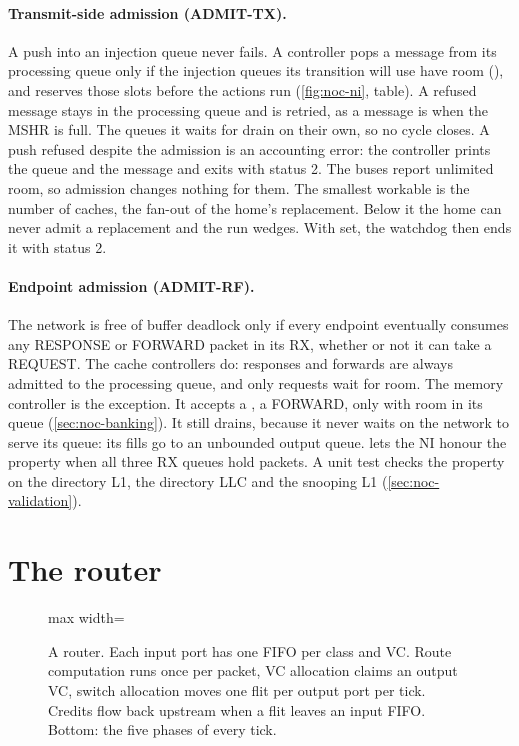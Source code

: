 \paragraph{Transmit-side admission (ADMIT-TX).} A push into an injection queue never fails. A
controller pops a message from its processing queue only if the injection queues its transition
will use have room (), and reserves those slots before the actions run
(\cref{fig:noc-ni}, table). A refused message stays in the processing queue and is retried, as a
message is when the MSHR is full. The queues it waits for drain on their own, so no cycle closes.
A push refused despite the admission is an accounting error: the controller prints the queue and
the message and exits with status 2. The buses report unlimited room, so admission changes nothing
for them. The smallest workable  is the number of caches, the fan-out of
the home's replacement. Below it the home can never admit a replacement and the run wedges. With
 set, the watchdog then ends it with status 2.

\paragraph{Endpoint admission (ADMIT-RF).} The network is free of buffer deadlock only if every
endpoint eventually consumes any RESPONSE or FORWARD packet in its RX, whether or not it can take
a REQUEST. The cache controllers do: responses and forwards are always admitted to the processing
queue, and only requests wait for room. The memory controller  is the
exception. It accepts a , a FORWARD, only with room in its queue
(\cref{sec:noc-banking}). It still drains, because it never waits on the network to serve its
queue: its fills go to an unbounded output queue.
 lets the NI honour the property when all three RX queues hold packets. A unit test checks the property on the directory L1, the
directory LLC and the snooping L1 (\cref{sec:noc-validation}).

\section{The router}\label{sec:noc-router}

\begin{figure}[htbp]\centering
\begin{adjustbox}{max width=\textwidth}\end{adjustbox}
\caption{A router. Each input port has one FIFO per class and VC. Route computation runs once per
packet, VC allocation claims an output VC, switch allocation moves one flit per output port per
tick. Credits flow back upstream when a flit leaves an input FIFO. Bottom: the five phases of
every tick.}
\label{fig:noc-router}
\end{figure}

